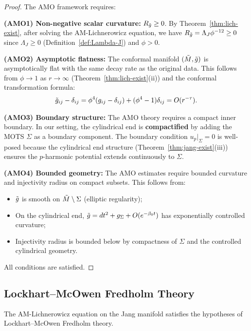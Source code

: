 \begin{proof}
The AMO framework requires:

\textbf{(AMO1) Non-negative scalar curvature:} $R_{\tilde{g}} \geq 0$. By Theorem~\ref{thm:lich-exist}, after solving the AM-Lichnerowicz equation, we have $R_{\tilde{g}} = \Lambda_J \phi^{-12} \geq 0$ since $\Lambda_J \geq 0$ (Definition~\ref{def:Lambda-J}) and $\phi > 0$.

\textbf{(AMO2) Asymptotic flatness:} The conformal manifold $(\tilde{M}, \tilde{g})$ is asymptotically flat with the same decay rate as the original data. This follows from $\phi \to 1$ as $r \to \infty$ (Theorem~\ref{thm:lich-exist}(ii)) and the conformal transformation formula:
\[
\tilde{g}_{ij} - \delta_{ij} = \phi^4(g_{ij} - \delta_{ij}) + (\phi^4 - 1)\delta_{ij} = O(r^{-\tau}).
\]

\textbf{(AMO3) Boundary structure:} The AMO theory requires a compact inner boundary. In our setting, the cylindrical end is \textbf{compactified} by adding the MOTS $\Sigma$ as a boundary component. The boundary condition $u_p|_\Sigma = 0$ is well-posed because the cylindrical end structure (Theorem~\ref{thm:jang-exist}(iii)) ensures the $p$-harmonic potential extends continuously to $\Sigma$.

\textbf{(AMO4) Bounded geometry:} The AMO estimates require bounded curvature and injectivity radius on compact subsets. This follows from:
\begin{itemize}
    \item $\tilde{g}$ is smooth on $\tilde{M} \setminus \Sigma$ (elliptic regularity);
    \item On the cylindrical end, $\tilde{g} = dt^2 + g_\Sigma + O(e^{-\beta_0 t})$ has exponentially controlled curvature;
    \item Injectivity radius is bounded below by compactness of $\Sigma$ and the controlled cylindrical geometry.
\end{itemize}

All conditions are satisfied. \qedhere
\end{proof}

\subsection{Lockhart--McOwen Fredholm Theory}

\begin{proposition}\label{prop:lm-compat}
The AM-Lichnerowicz equation on the Jang manifold satisfies the hypotheses of Lockhart--McOwen Fredholm theory.
\end{proposition}

